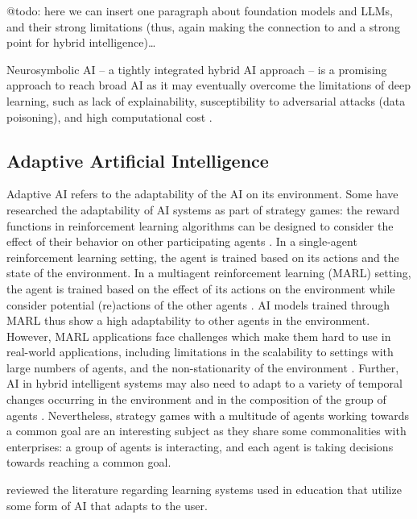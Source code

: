 {\color{purple} @todo: here we can insert one paragraph about foundation models and LLMs, and their strong limitations
(thus, again making the connection to and a strong point for hybrid intelligence)\dots}

Neurosymbolic AI -- a tightly integrated hybrid
AI approach -- is a promising approach to reach broad AI as it may eventually overcome the limitations of deep learning, such
as lack of explainability, susceptibility to adversarial attacks (data poisoning), and high computational cost
\citep{hochreiterBroadAI2022,garcezNeurosymbolicAI3rd2023}.


\subsection{Adaptive Artificial Intelligence}

Adaptive AI refers to the adaptability of the AI on its environment. Some have researched the adaptability of AI
systems as part of strategy games: the reward functions in reinforcement learning algorithms can be designed to consider
the effect of their behavior on other participating agents \citep{madeiraDesigningReinforcementLearningBased2006}.
In a single-agent reinforcement learning setting, the agent is trained based on its actions and the state of the
environment. In a multiagent reinforcement learning (MARL) setting, the agent is trained based on the effect of its
actions on the environment while consider potential (re)actions of the other agents \citep{caneseMultiAgentReinforcementLearning2021}.
AI models trained through MARL thus show a high adaptability to other agents in the environment. However, MARL applications
face challenges which make them hard to use in real-world applications, including limitations in the scalability to settings
with large numbers of agents, and the non-stationarity of the environment \citep{caneseMultiAgentReinforcementLearning2021}. 
Further, AI in hybrid intelligent systems may also need to adapt to a variety of temporal changes occurring in the environment
and in the composition of the group of agents \citep{akataResearchAgendaHybrid2020}. Nevertheless, strategy games with a
multitude of agents working towards a common goal are an interesting subject as they share some commonalities with enterprises:
a group of agents is interacting, and each agent is taking decisions towards reaching a common goal.


\cite{kabudiAIenabledAdaptiveLearning2021} reviewed the literature regarding learning systems used in education
that utilize some form of AI that adapts to the user. 


